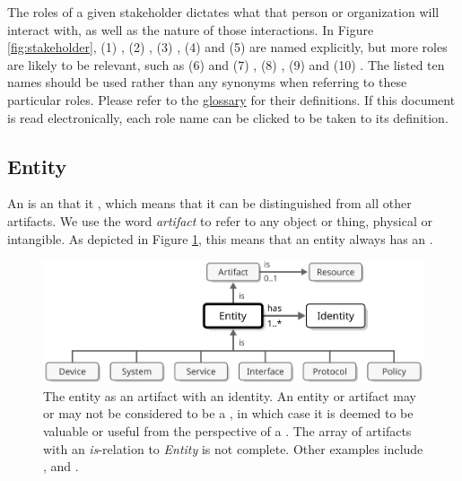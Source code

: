The roles of a given stakeholder dictates what  that person or organization will interact with, as well as the nature of those interactions.
In Figure \ref{fig:stakeholder}, (1) , (2) , (3) , (4)  and (5)  are named explicitly, but more roles are likely to be relevant, such as (6)  and (7) , (8) , (9)  and (10) .
The listed ten names should be used rather than any synonyms when referring to these particular roles.
Please refer to the \hyperref[sec:glossary]{glossary} for their definitions.
If this document is read electronically, each role name can be clicked to be taken to its definition.

\subsection{Entity}
\label{sec:concepts:entity}

An  is an  that it , which means that it can be distinguished from all other artifacts.
We use the word \textit{artifact} to refer to any object or thing, physical or intangible.
As depicted in Figure \ref{fig:entity}, this means that an entity always has an .

\begin{figure}[ht!]
  \centering
  \includegraphics[scale=0.9]{figures/entity}
  \caption{
    The entity as an artifact with an identity.
    An entity or artifact may or may not be considered to be a , in which case it is deemed to be valuable or useful from the perspective of a .
    The array of artifacts with an \textit{is}-relation to \textit{Entity} is not complete.
    Other examples include ,  and .
  }
  \label{fig:entity}
\end{figure}

